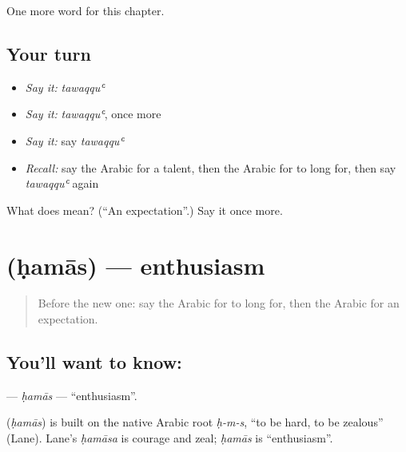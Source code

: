 \begin{grammarlens}[title={What you've built}]
One more word for this chapter.
\end{grammarlens}

\subsection*{Your turn}
\begin{itemize}
\raggedright
  \item \emph{Say it:} \emph{tawaqquʿ}
  \item \emph{Say it:} \emph{tawaqquʿ}, once more
  \item \emph{Say it:} say \emph{tawaqquʿ}
  \item \emph{Recall:} say the Arabic for a talent, then the Arabic for to long for, then say \emph{tawaqquʿ} again
\end{itemize}

\begin{tcolorbox}[breakable,colback=teal!4,colframe=teal!35!black,title={Before you move on}]
What does  mean? (\textquotedblleft{}An expectation\textquotedblright{}.) Say it once more.
\end{tcolorbox}
\section[\texorpdfstring{\ar{حماس} (ḥamās)}{حماس (ḥamās)}]{ (ḥamās) — enthusiasm}

\label{lesson:AR-C111-hamas}



\begin{quote}
Before the new one: say the Arabic for to long for, then the Arabic for an expectation.
\end{quote}

\subsection*{You'll want to know: }
\textbf{} — \emph{ḥamās} — \textquotedblleft{}enthusiasm\textquotedblright{}.

\begin{cousinweb}
\textbf{} (\emph{ḥamās}) is built on the native Arabic root \emph{ḥ-m-s}, \textquotedblleft{}to be hard, to be zealous\textquotedblright{} (Lane). Lane's \emph{ḥamāsa} is courage and zeal; \emph{ḥamās} is \textquotedblleft{}enthusiasm\textquotedblright{}.
\end{cousinweb}

